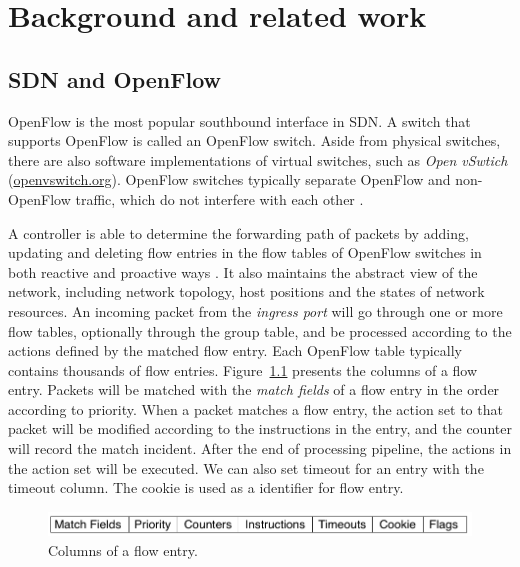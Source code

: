 \chapter{Background and related work}
\section{SDN and OpenFlow}
\label{SDN and OpenFlow}
OpenFlow is the most popular southbound interface in SDN. A switch that supports OpenFlow is called an OpenFlow switch. Aside from physical switches, there are also software implementations of virtual switches, such as \textit{Open vSwtich} (\url{openvswitch.org}). OpenFlow switches typically separate OpenFlow and non-OpenFlow traffic, which do not interfere with each other \cite{HP_SPEC}.

A controller is able to determine the forwarding path of packets by adding, updating and deleting flow entries in the flow tables of OpenFlow switches in both reactive and proactive ways \cite{OF_SPEC}. It also maintains the abstract view of the network, including network topology, host positions and the states of network resources. An incoming packet from the \textit{ingress port} will go through one or more flow tables, optionally through the group table, and be processed according to the actions defined by the matched flow entry. Each OpenFlow table typically contains thousands of flow entries. Figure~\ref{FE_Col} presents the columns of a flow entry. Packets will be matched with the \textit{match fields} of a flow entry in the order according to priority. When a packet matches a flow entry, the action set to that packet will be modified according to the instructions in the entry, and the counter will record the match incident. After the end of processing pipeline, the actions in the action set will be executed. We can also set timeout for an entry with the timeout column. The cookie is used as a identifier for flow entry.

\begin{figure}[H]
\begin{center} 
\includegraphics[width=1\textwidth]{figures/columns_of_flow_entry.png}
\end{center}
\caption{Columns of a flow entry.}
\label{FE_Col}
\end{figure}

